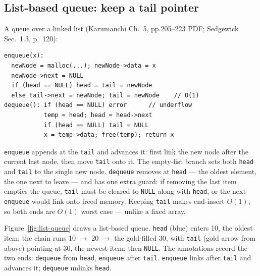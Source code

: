 \documentclass[11pt]{article}
\begin{document}
\subsection{List-based queue: keep a tail pointer}

A queue over a linked list (Karumanchi Ch.~5, pp.205--223 PDF; Sedgewick Sec.~1.3, p.~120):

{\footnotesize
\begin{verbatim}
enqueue(x):
  newNode = malloc(...); newNode->data = x
  newNode->next = NULL
  if (head == NULL) head = tail = newNode
  else tail->next = newNode; tail = newNode    // O(1)
dequeue(): if (head == NULL) error      // underflow
           temp = head; head = head->next
           if (head == NULL) tail = NULL
           x = temp->data; free(temp); return x
\end{verbatim}
}

\texttt{enqueue} appends at the \texttt{tail} and advances it: first link the new node after the current last node, then move \texttt{tail} onto it. The empty-list branch sets both \texttt{head} and \texttt{tail} to the single new node. \texttt{dequeue} removes at \texttt{head} --- the oldest element, the one next to leave --- and has one extra guard: if removing the last item empties the queue, \texttt{tail} must be cleared to \texttt{NULL} along with \texttt{head}, or the next \texttt{enqueue} would link onto freed memory. Keeping \texttt{tail} makes end-insert $O(1)$, so both ends are $O(1)$ worst case --- unlike a fixed array. \cite{Karumanchi2017_data_structures_algorithms_made_easy,Sedgewick2011_algorithms}

Figure~\ref{fig:list-queue} draws a list-based queue. \texttt{head} (blue) enters 10, the oldest item; the chain runs 10 $\to$ 20 $\to$ the gold-filled 30, with \texttt{tail} (gold arrow from above) pointing at 30, the newest item; then \texttt{NULL}. The annotations record the two ends: \texttt{dequeue} from \texttt{head}, \texttt{enqueue} after \texttt{tail}. \texttt{enqueue} links after \texttt{tail} and advances it; \texttt{dequeue} unlinks \texttt{head}.
\end{document}
